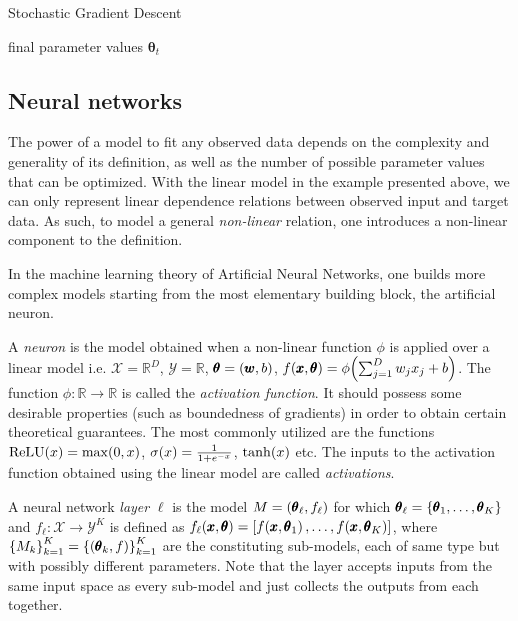 \begin{algorithm}%
\caption{Stochastic Gradient Descent}
\label{algorithm:sgd}
\begin{algorithmic}
\ENDWHILE
\RETURN final parameter values $\pmb{\theta}_{t}$
\end{algorithmic}
\end{algorithm} 


\subsection{Neural networks}
The power of a model to fit any observed data depends on the complexity and generality of its definition, as well as the number of possible parameter values that can be optimized. With the linear model in the example presented above, we can only represent linear dependence relations between observed input and target data. As such, to model a general \emph{non-linear} relation, one introduces a non-linear component to the definition.

In the machine learning theory of Artificial Neural Networks, one builds more complex models starting from the most elementary building block, the artificial neuron.
\begin{definition}
A \emph{neuron} is the model obtained when a non-linear function $\phi$ is applied over a linear model i.e. $\mathcal{X} = \mathbb{R}^D$, $\mathcal{Y}=\mathbb{R}$, $\pmb{\theta} = \mathopen{}\left(\pmb{w}, b\right)$, $f\mathopen{}\left(\pmb{x}, \pmb{\theta}\right) = \phi\mathopen{}\left(\sum_{j=1}^{D}{w_j x_j} + b\right)$. The function $\phi: \mathbb{R} \to \mathbb{R}$ is called the \emph{activation function}. It should possess some desirable properties (such as boundedness of gradients) in order to obtain certain theoretical guarantees. The most commonly utilized are the functions $\text{ReLU}\mathopen{}\left(x\right)=\max\mathopen{}\left(0,x\right)$, $\sigma\mathopen{}\left(x\right)=\frac{1}{1+e^{-x}}$, $\tanh\mathopen{}\left(x\right)$ etc. The inputs to the activation function obtained using the linear model are called \emph{activations}.
\end{definition}

\begin{definition}
A neural network \emph{layer} $\ell$ is the model $M = \mathopen{}\left(\pmb{\theta}_{\ell}, f_{\ell}\right)$ for which $\pmb{\theta}_{\ell} = \mathopen{}\left\{\pmb{\theta}_1, \dots, \pmb{\theta}_K\right\}$ and $f_{\ell}: \mathcal{X} \to \mathcal{Y}^K$ is defined as $f_{\ell}\mathopen{}\left(\pmb{x}, \pmb{\theta}\right) = \mathopen{}\left[f\mathopen{}\left(\pmb{x}, \pmb{\theta}_1\right),\dots,f\mathopen{}\left(\pmb{x}, \pmb{\theta}_K\right)\right]$, where $\mathopen{}\left\{M_k\right\}_{k=1}^K=\mathopen{}\left\{\mathopen{}\left(\pmb{\theta}_k, f\right)\right\}_{k=1}^K$ are the constituting sub-models, each of same type but with possibly different parameters. Note that the layer accepts inputs from the same input space as every sub-model and just collects the outputs from each together.
\end{definition}

